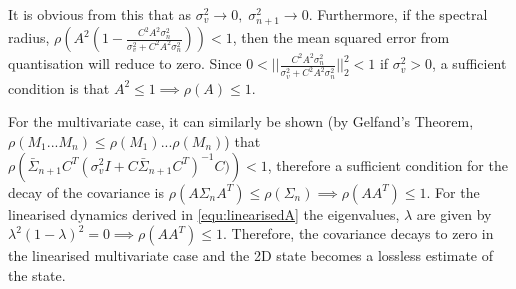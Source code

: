 \documentclass[../main.tex]{subfiles}
\begin{document}
{It is obvious from this that as $\sigma_v^2 \rightarrow 0, \; \sigma_{n+1}^2 \rightarrow 0$. Furthermore, if the spectral radius, $\rho \left(A^2(1 - \frac{C^2 A^2\sigma_n^2}{\sigma_v^2 + C^2 A^2 \sigma_n^2}) \right) < 1$, then the mean squared error from quantisation will reduce to zero. Since $0 < ||\frac{C^2 A^2\sigma_n^2}{\sigma_v^2 + C^2 A^2 \sigma_n^2}||^2_2 < 1$ if $\sigma_v^2 > 0$, a sufficient condition is that $A^2 \leq 1 \implies \rho(A) \leq 1$.

For the multivariate case, it can similarly be shown (by Gelfand's Theorem, $\rho(M_1 ... M_n) \leq \rho(M_1)...\rho(M_n)$) that $\rho\left(\bar{\Sigma}_{n+1}C^T (\sigma_v^2 I + C \bar{\Sigma}_{n+1} C^T)^{-1} C)\right) < 1$, therefore a sufficient condition for the decay of the covariance is $\rho(A \Sigma_n A^T) \leq \rho(\Sigma_n) \implies \rho(A A^T) \leq 1$. For the linearised dynamics derived in \cref{equ:linearisedA} the eigenvalues, $\lambda$ are given by $\lambda^2(1-\lambda)^2 = 0 \implies \rho(AA^T) \leq 1$. Therefore, the covariance decays to zero in the linearised multivariate case and the 2D state becomes a lossless estimate of the state.

} %
\onlyinsubfile{}
\end{document}
